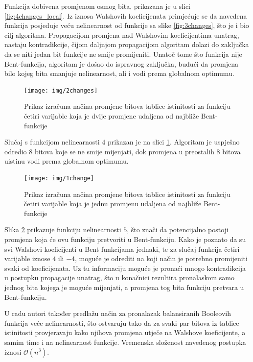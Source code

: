 Funkcija dobivena promjenom osmog bita, prikazana je u slici \ref{fig:4changes_local}.
Iz iznosa Walshovih koeficijenata primjećuje se da navedena funkcija posjeduje veću nelinearnost od funkcije sa slike \ref{fig:3changes}, što je i bio cilj algoritma.
Propagacijom promjena nad Walshovim koeficijentima unatrag, nastaju kontradikcije, čijom daljnjom propagacijom algoritam dolazi do zaključka da se niti jedan bit funkcije ne smije promijeniti.
Unatoč tome što funkcija nije Bent-funkcija, algoritam je došao do ispravnog zaključka, budući da promjena bilo kojeg bita smanjuje nelinearnost, ali i vodi prema globalnom optimumu.

\begin{figure}[ht!] 
    \centering
    \texttt{[image: img/2changes]}
    \captionsetup{justification=centering}
    \caption{Prikaz izračuna načina promjene bitova tablice istinitosti za funkciju četiri varijable koja je dvije promjene udaljena od najbliže Bent-funkcije}
    \label{fig:2changes}
\end{figure}

Slučaj s funkcijom nelinearnosti $4$ prikazan je na slici \ref{fig:2changes}.
Algoritam je uspješno odredio $8$ bitova koje se ne smije mijenjati, dok promjena u preostalih $8$ bitova uistinu vodi prema globalnom optimumu.

\begin{figure}[ht!] 
    \centering
    \texttt{[image: img/1change]}
    \captionsetup{justification=centering}
    \caption{Prikaz izračuna načina promjene bitova tablice istinitosti za funkciju četiri varijable koja je jednu promjenu udaljena od najbliže Bent-funkcije}
    \label{fig:1change}
\end{figure}

Slika \ref{fig:1change} prikazuje funkciju nelinearnosti $5$, što znači da potencijalno postoji promjena koja će ovu funkciju pretvoriti u Bent-funkciju.
Kako je poznato da su svi Walshovi koeficijenti u Bent funkcijama jednaki, te za slučaj funkcija četiri varijable iznose $4$ ili $-4$, moguće je odrediti na koji način je potrebno promijeniti svaki od koeficijenata.
Uz tu informaciju moguće je pronaći mnogo kontradikcija u postupku propagacije unatrag, što u konačnici rezultira pronalaskom samo jednog bita kojega je moguće mijenjati, a promjena tog bita funkciju pretvara u Bent-funkciju. 

U radu \cite{millan1997smart} autori također predlažu način za pronalazak balansiranih Booleovih funkcija veće nelinearnosti, što ostvaruju tako da za svaki par bitova iz tablice istinitosti provjeravaju kako njihova promjena utječe na Walshove koeficijente, a samim time i na nelinearnost funkcije.
Vremenska složenost navedenog postupka iznosi $\mathcal{O}(n^3)$.

